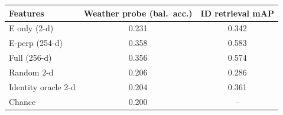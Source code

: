 \begin{tabular}{lcc}
\toprule
Features & Weather probe (bal.\ acc.) & ID retrieval mAP \\
\midrule
E only (2-d) & 0.231 & 0.342 \\
E-perp (254-d) & 0.358 & 0.583 \\
Full (256-d) & 0.356 & 0.574 \\
Random 2-d & 0.206 & 0.286 \\
Identity oracle 2-d & 0.204 & 0.361 \\
\midrule
Chance & 0.200 & -- \\
\bottomrule
\end{tabular}
